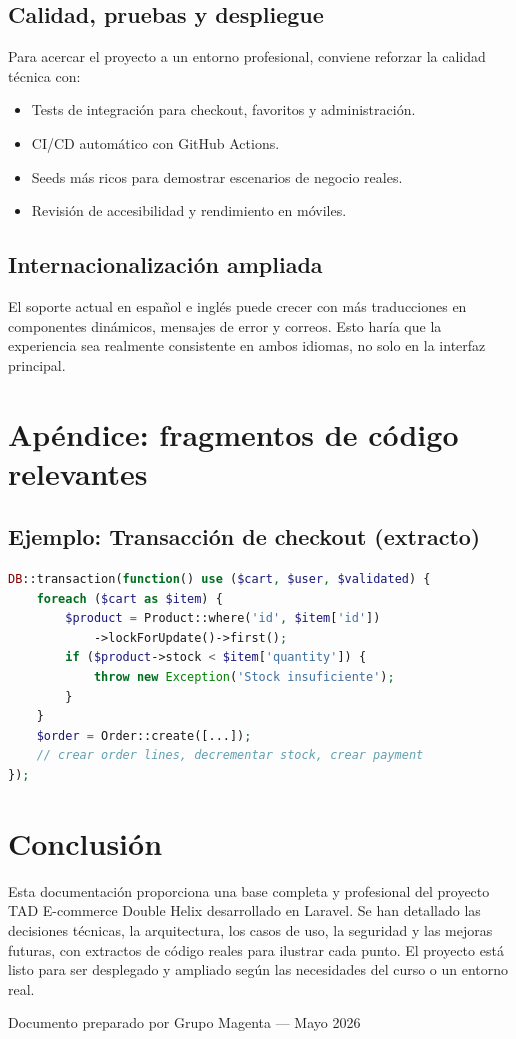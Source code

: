 \documentclass[12pt,a4paper]{report}
\begin{document}
\section{Calidad, pruebas y despliegue}

Para acercar el proyecto a un entorno profesional, conviene reforzar la calidad técnica con:

\begin{itemize}
  \item Tests de integración para checkout, favoritos y administración.
  \item CI/CD automático con GitHub Actions.
  \item Seeds más ricos para demostrar escenarios de negocio reales.
  \item Revisión de accesibilidad y rendimiento en móviles.
\end{itemize}

\section{Internacionalización ampliada}

El soporte actual en español e inglés puede crecer con más traducciones en componentes dinámicos, mensajes de error y correos. Esto haría que la experiencia sea realmente consistente en ambos idiomas, no solo en la interfaz principal.

\chapter{Apéndice: fragmentos de código relevantes}

\section{Ejemplo: Transacción de checkout (extracto)}
\begin{lstlisting}[language=PHP]
DB::transaction(function() use ($cart, $user, $validated) {
    foreach ($cart as $item) {
        $product = Product::where('id', $item['id'])
            ->lockForUpdate()->first();
        if ($product->stock < $item['quantity']) {
            throw new Exception('Stock insuficiente');
        }
    }
    $order = Order::create([...]);
    // crear order lines, decrementar stock, crear payment
});
\end{lstlisting}

\chapter{Conclusión}

Esta documentación proporciona una base completa y profesional del proyecto TAD E-commerce Double Helix 
desarrollado en Laravel. Se han detallado las decisiones técnicas, la arquitectura, los casos de uso, la seguridad y 
las mejoras futuras, con extractos de código reales para ilustrar cada punto. El proyecto está listo para ser desplegado
y ampliado según las necesidades del curso o un entorno real.

\vspace{1cm}
Documento preparado por Grupo Magenta — Mayo 2026
\end{document}

